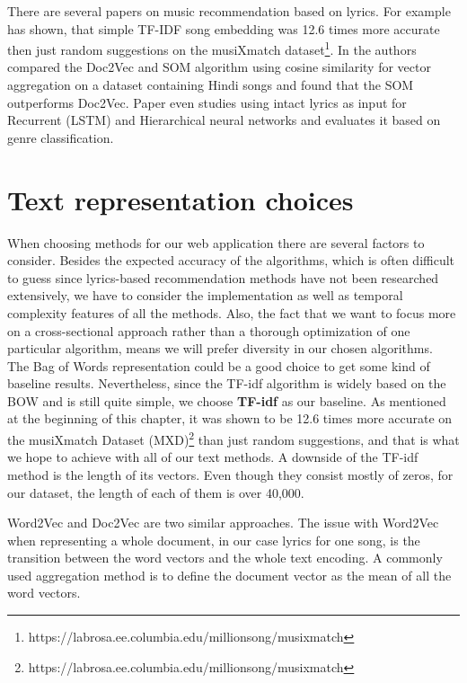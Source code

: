  There are several papers on music recommendation based on lyrics. For example \cite{Gossi2016LyricBasedMR} has shown, that simple TF-IDF song embedding was 12.6 times more accurate then just random suggestions on the musiXmatch dataset\footnote{https://labrosa.ee.columbia.edu/millionsong/musixmatch}.  In \cite{inproceedings} the authors compared the Doc2Vec and SOM algorithm using cosine similarity for vector aggregation on a dataset containing Hindi songs and found that the SOM outperforms Doc2Vec. Paper \cite{DBLP:journals/corr/Tsaptsinos17} even studies using intact lyrics as input for Recurrent (LSTM) and Hierarchical neural networks and evaluates it based on genre classification.

\section{Text representation choices}
When choosing methods for our web application there are several factors to consider. Besides the expected accuracy of the algorithms, which is often difficult to guess since lyrics-based recommendation methods have not been researched extensively, we have to consider the implementation as well as temporal complexity features of all the methods. Also, the fact that we want to focus more on a cross-sectional approach rather than a thorough optimization of one particular algorithm, means we will prefer diversity in our chosen algorithms.  \\

The Bag of Words representation could be a good choice to get some kind of baseline results. Nevertheless, since the TF-idf algorithm is widely based on the BOW and is still quite simple, we choose \textbf{TF-idf} as our baseline. As mentioned at the beginning of this chapter, it was shown to be 12.6 times more accurate on the musiXmatch Dataset (MXD)\footnote{https://labrosa.ee.columbia.edu/millionsong/musixmatch} than just random suggestions, and that is what we hope to achieve with all of our text methods. A downside of the TF-idf method is the length of its vectors. Even though they consist mostly of zeros, for our dataset, the length of each of them is over 40,000. 

Word2Vec and Doc2Vec are two similar approaches. The issue with Word2Vec when representing a whole document, in our case lyrics for one song, is the transition between the word vectors and the whole text encoding. A commonly used aggregation method is to define the document vector as the mean of all the word vectors. 

